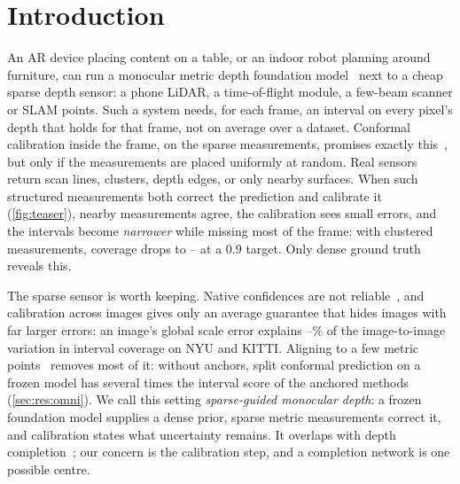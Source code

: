 \section{Introduction}
\label{sec:intro}

An AR device placing content on a table, or an indoor robot planning around furniture, can run a monocular metric depth foundation model~\cite{yang2024dav2,piccinelli2025unidepthv2,hu2024metric3dv2,bochkovskii2025depthpro} next to a cheap sparse depth sensor: a phone LiDAR, a time-of-flight module, a few-beam scanner or SLAM points.
Such a system needs, for each frame, an interval on every pixel's depth that holds for that frame, not on average over a dataset.
Conformal calibration inside the frame, on the sparse measurements, promises exactly this~\cite{mao2024spatial,gui2023cmc}, but only if the measurements are placed uniformly at random.
Real sensors return scan lines, clusters, depth edges, or only nearby surfaces.
When such structured measurements both correct the prediction and calibrate it (\cref{fig:teaser}), nearby measurements agree, the calibration sees small errors, and the intervals become \emph{narrower} while missing most of the frame: with clustered measurements, coverage drops to \NumLocalClusterCovLo--\NumLocalClusterCovHi{} at a $0.9$ target.
Only dense ground truth reveals this.

The sparse sensor is worth keeping.
Native confidences are not reliable~\cite{deng2026calibrationaudit}, and calibration across images gives only an average guarantee that hides images with far larger errors: an image's global scale error explains \NumScaleVarLo--\NumScaleVarHi\% of the image-to-image variation in interval coverage on NYU and KITTI.
Aligning to a few metric points~\cite{ranftl2022midas,wofk2023videpth} removes most of it: without anchors, split conformal prediction on a frozen model has several times the interval score of the anchored methods (\cref{sec:res:omni}).
We call this setting \emph{sparse-guided monocular depth}: a frozen foundation model supplies a dense prior, sparse metric measurements correct it, and calibration states what uncertainty remains.
It overlaps with depth completion~\cite{zuo2025omnidc,lin2025promptda}; our concern is the calibration step, and a completion network is one possible centre.

